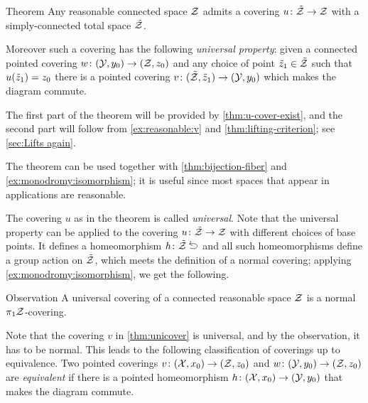 \begin{thm}{Theorem}\label{thm:unicover}
Any reasonable connected space $\mathcal{Z}$ admits a covering $u\:\tilde{\c{Z}}\z\to \c{Z}$ with a simply-connected total space $\tilde{\mathcal{Z}}$.

Moreover such a covering has the following \emph{universal property}:
given a connected pointed covering $w\colon(\mathcal{Y},y_0)\to (\mathcal{Z},z_0)$ and any choice of point $\tilde z_1\in \tilde{\mathcal{Z}}$ such that $u(\tilde z_1)\z=z_0$ there is a pointed covering $v\:(\tilde{\c{Z}},\tilde z_1)\z\to (\c{Y},y_0)$ which makes the diagram commute.
\end{thm}

The first part of the theorem will be provided by \ref{thm:u-cover-exist}, and the second part will follow from \ref{ex:reasonable:v} and \ref{thm:lifting-criterion}; see \ref{sec:Lifts again}.

The theorem can be used together with \ref{thm:bijection-fiber} and \ref{ex:monodromy:isomorphism};
it is useful since most spaces that appear in applications are reasonable.

The covering $u$ as in the theorem is called \emph{universal}.
Note that the universal property can be applied to the covering $u\:\tilde{\c{Z}}\z\to \c{Z}$ with different choices of base points.
It defines a homeomorphism $h\:\tilde{\c{Z}}\selfup$ and all such homeomorphisms define a group action on $\tilde{\mathcal{Z}}$, which meets the definition of a normal covering;
applying \ref{ex:monodromy:isomorphism}, we get the following.

\begin{thm}{Observation}
A universal covering of a connected reasonable space $\mathcal{Z}$ is a normal $\pi_1\mathcal{Z}$-covering.
\end{thm}

\begin{figure}
\vskip-6mm
\centering
{}
\end{figure}

Note that the covering $v$ in \ref{thm:unicover} is universal, and by the observation, it has to be normal.
This leads to the following classification of coverings up to equivalence.
Two pointed coverings $v\:(\c{X},x_0)\z\to (\c{Z},z_0)$ and $w\:(\c{Y},y_0)\z\to (\c{Z},z_0)$ are \emph{equivalent} if there is a pointed homeomorphism $h\:(\c{X},x_0)\z\to(\c{Y},y_0)$ that makes the diagram commute.

